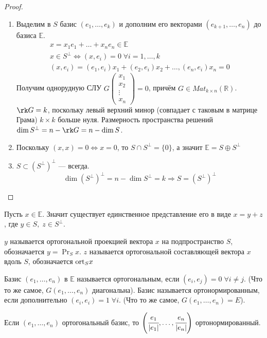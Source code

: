 \begin{proof}
	\begin{enumerate}
	\item Выделим в $S$ базис $(e_1, \ldots, e_k)$ и дополним его векторами $(e_{k+1}, \ldots, e_n)$ до базиса $\mathbb{E}$.
	\begin{gather*}
		x = x_1e_1 + \ldots + x_ne_n \in\mathbb{E}\\
		x \in S^\perp \Leftrightarrow (x,e_i) = 0\; \forall i = 1,\ldots, k\\
		(x,e_i) = (e_1, e_i)x_1 + (e_2, e_i) x_2 + \ldots, (e_n, e_i) x_n= 0		
	\end{gather*}
	Получим однорудную СЛУ $G\begin{pmatrix}
	x_1\\x_2\\ \vdots\\ x_n
	\end{pmatrix} = 0$, причём $G \in Mat_{k\times n}(\mathbb{R})$. $\rk G = k$, поскольку левый верхний минор (совпадает с таковым в матрице Грама) $k \times k$ больше нуля. Размерность пространства решений $\dim S^\perp = n - \rk G = n - \dim S$.
	\item Поскольку $(x,x) = 0 \Leftrightarrow x = 0$, то $S \cap S^\perp = \{0\}$, а значит $\mathbb{E} = S \oplus S^\perp$
	\item $S \subset (S^\perp)^\perp$ --- всегда.
	\[
		\dim (S^\perp)^\perp = n - \dim S^\perp = k \Rightarrow S = (S^\perp)^\perp
	\]
\end{enumerate}
\end{proof}
Пусть $x \in \mathbb{E}$. Значит существует единственное представление его в виде $x = y + z$, где $y \in S,\; z \in S^\perp$.
\begin{Def}
	$y$ называется ортогональной проекцией вектора $x$ на подпространство $S$, обозначается $y = \Pr_S x$. $z$ называется ортогональной составляющей вектора $x$ вдоль $S$, обозначается $\mathrm{ort}_S x$
\end{Def}
\begin{Def}
	Базис $(e_1, \ldots, e_n)$ в $\mathbb{E}$ называется ортогональным, если $(e_i, e_j) = 0\; \forall i\neq j$. (Что то же самое, $G(e_1, \ldots, e_n)$ диагональна). Базис называется ортонормированным, если дополнительно $(e_i, e_i) = 1\; \forall i$. (Что то же самое, $G(e_1, \ldots, e_n) = E$).
\end{Def}
\begin{Comment}
	Если $(e_1,\ldots, e_n)$ ортогональный базис, то $\left(\cfrac{e_1}{|e_1|}, \ldots, \cfrac{e_n}{|e_n|}\right)$ ортонормированный.
\end{Comment}
